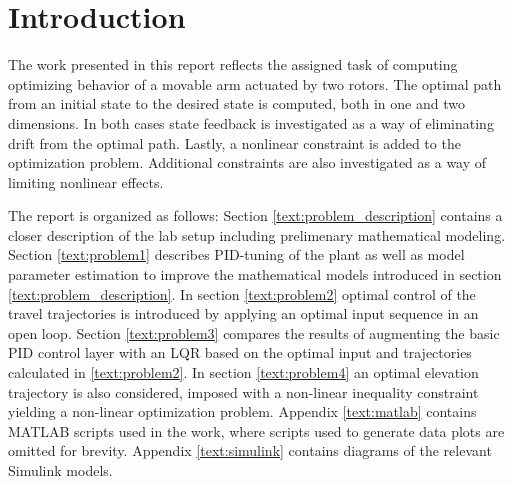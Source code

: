 \section{Introduction}
The work presented in this report reflects the assigned task of computing optimizing behavior of a movable arm actuated by two rotors. The optimal path from an initial state to the desired state is computed, both in one and two dimensions. In both cases state feedback is investigated as a way of eliminating drift from the optimal path. Lastly, a nonlinear constraint is added to the optimization problem. Additional constraints are also investigated as a way of limiting nonlinear effects.

The report is organized as follows: Section \ref{text:problem_description} contains a closer description of the lab setup including prelimenary mathematical modeling. Section \ref{text:problem1} describes PID-tuning of the plant as well as model parameter estimation to improve the mathematical models introduced in section \ref{text:problem_description}. In section \ref{text:problem2} optimal control of the travel trajectories is introduced by applying an optimal input sequence in an open loop. Section \ref{text:problem3} compares the results of augmenting the basic PID control layer with an LQR based on the optimal input and trajectories calculated in \ref{text:problem2}. In section \ref{text:problem4} an optimal elevation trajectory is also considered, imposed with a non-linear inequality constraint yielding a non-linear optimization problem. Appendix \ref{text:matlab} contains MATLAB scripts used in the work, where scripts used to generate data plots are omitted for brevity. Appendix \ref{text:simulink} contains diagrams of the relevant Simulink models.
